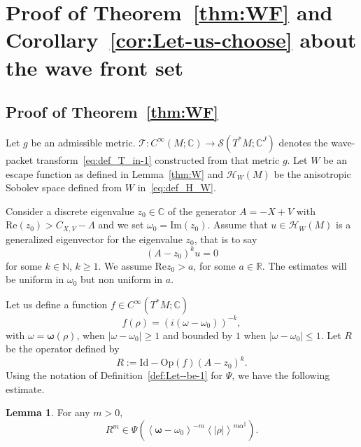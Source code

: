 \documentclass[10pt]{amsart}
\theoremstyle{definition}\newtheorem{defi}[theo]{Definition}\newtheorem{rema}[theo]{Remark}\newtheorem{exam}[theo]{Example}\newtheorem{exem}[theo]{Example}\newtheorem{nota}[theo]{Notation}
\newcommand{\clS}{\mathcal{S}}
\newcommand{\clT}{\mathcal{T}}
\newcommand{\clH}{\mathcal{H}}
\newcommand{\Ree}{\mathrm{Re}}
\newcommand{\Imm}{\mathrm{Im}}
\newcommand{\Opp}{\mathrm{Op}}
\newcommand{\Id}{\mathrm{Id}}
\newcommand{\bbR}{\mathbb{R}}
\newcommand{\bbC}{\mathbb{C}}
\newcommand{\bbN}{\mathbb{N}}
\newtheorem{lem}[theo]{Lemma}\newtheorem{rem}[theo]{Remark}
\begin{document}
\section{Proof of Theorem~\ref{thm:WF} and Corollary~\ref{cor:Let-us-choose} about the wave front set}\label{sec:Proof-of-Theorem_WF}

\subsection{Proof of Theorem~\ref{thm:WF}}

Let $g$ be an admissible metric. $\clT:C^{\infty}(M;\bbC)\rightarrow\clS(T^{*}M;\bbC^{J})$ denotes the wave-packet transform~\eqref{eq:def_T_in-1} constructed from that metric $g$. Let $W$ be an escape function as defined in Lemma~\ref{thm:W} and $\clH _{W}\left(M\right)$ be the anisotropic Sobolev space defined from $W$ in~\eqref{eq:def_H_W}.

Consider a discrete eigenvalue $z_{0}\in\bbC$ of the generator $A=-X+V$ with $\Ree(z_{0})>C_{X,V}-\Lambda$ and we set $\omega_{0}=\Imm(z_{0})$. Assume that $u\in\clH _{W}\left(M\right)$ is a generalized eigenvector for the eigenvalue $z_{0}$, that is to say
\begin{equation}\label{eq:Aku}
\left(A-z_{0}\right)^{k}u=0
\end{equation}
for some $k\in\bbN$, $k\geq1$. We assume $\Ree z_{0}>a$, for some $a\in\bbR$. The estimates will be uniform in $\omega_{0}$ but non uniform in $a$.

Let us define a function $f\in C^{\infty}\left(T^{*}M;\bbC\right)$
\[
f\left(\rho\right)=\left(i\left(\omega-\omega_{0}\right)\right)^{-k},
\]
with $\omega=\boldsymbol{\omega}(\rho)$, when $|\omega-\omega_{0}|\geq1$ and bounded by $1$ when $|\omega-\omega_{0}|\leq1$. Let $R$ be the operator defined by
\begin{equation}\label{eq:def_R-2}
R:=\Id -\Opp (f)(A-z_{0})^{k}.
\end{equation}
Using the notation of Definition~\ref{def:Let--be-1} for $\Psi$, we have the following estimate.
\begin{lem}
For any $m>0$,
\begin{equation}\label{eq:Rm}
R^{m}\in\Psi\left(\left\langle \boldsymbol{\omega}-\omega_{0}\right\rangle ^{-m}\left\langle \left|\rho\right|\right\rangle ^{m\alpha^{\parallel}}\right).
\end{equation}
\end{lem}
\end{document}
